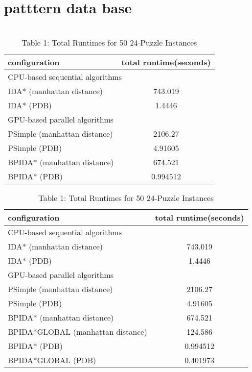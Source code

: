 \documentclass[a4paper,11pt,oneside,openany]{jsbook}
\begin{document}
\section{patttern data base}

\section{}









\begin{table}[]
\centering
\caption{Table 1: Total Runtimes for 50 24-Puzzle Instances}
\label{my-label}
\begin{tabular}{|l|c|}
\hline
configuration & \multicolumn{1}{l|}{total runtime(seconds)} \\ \hline
\multicolumn{2}{|l|}{CPU-based sequential algorithms} \\ \hline
IDA* (manhattan distance) & 743.019 \\
IDA* (PDB) & 1.4446 \\ \hline
\multicolumn{2}{|l|}{GPU-based parallel algorithms} \\ \hline
PSimple (manhattan distance) & 2106.27 \\
PSimple (PDB) & 4.91605 \\
BPIDA* (manhattan distance) & 674.521 \\
BPIDA* (PDB) & 0.994512 \\ \hline
\end{tabular}
\end{table}

\begin{table}[]
\centering
\caption{Table 1: Total Runtimes for 50 24-Puzzle Instances}
\label{my-label}
\begin{tabular}{|l|c|}
\hline
configuration & \multicolumn{1}{l|}{total runtime(seconds)} \\ \hline
\multicolumn{2}{|l|}{CPU-based sequential algorithms} \\ \hline
IDA* (manhattan distance) & 743.019 \\
IDA* (PDB) & 1.4446 \\ \hline
\multicolumn{2}{|l|}{GPU-based parallel algorithms} \\ \hline
PSimple (manhattan distance) & 2106.27 \\
PSimple (PDB) & 4.91605 \\
BPIDA* (manhattan distance) & 674.521 \\
BPIDA*GLOBAL (manhattan distance) & 124.586 \\
BPIDA* (PDB) & 0.994512 \\
BPIDA*GLOBAL (PDB) & 0.401973 \\ \hline
\end{tabular}
\end{table}
\end{document}
